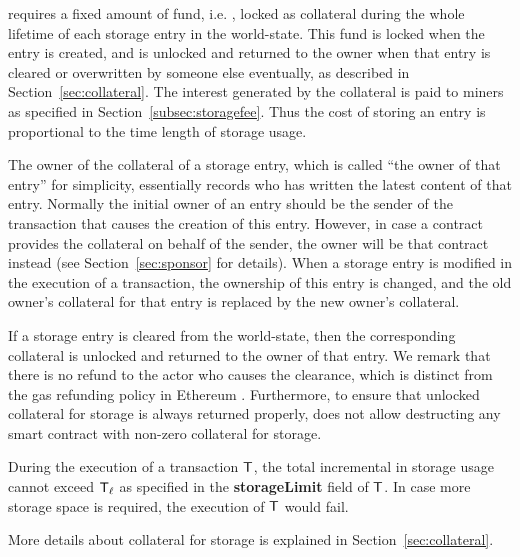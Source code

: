 	\name requires a fixed amount of fund, i.e. \sunitprice, locked as collateral during the whole lifetime of each \sunitsize storage entry in the world-state.
	This fund is locked when the entry is created, and is unlocked and returned to the owner when that entry is cleared or overwritten by someone else eventually, as described in Section~\ref{sec:collateral}.
	The interest generated by the collateral is paid to miners as specified in Section~\ref{subsec:storagefee}. 
	Thus the cost of storing an entry  
	is proportional to the time length of storage usage.

	
	The owner of the collateral of a storage entry, 
	which is called ``the owner of that entry'' for simplicity, 
	essentially records who has written the latest content of that entry.
	Normally the initial owner of an entry should be the sender of the transaction that causes the creation of this entry. 
	However, in case a contract provides the collateral on behalf of the sender, the owner will be that contract instead (see Section~\ref{sec:sponsor} for details).
	When a storage entry is modified in the execution of a transaction,
	the ownership of this entry is changed,
	and the old owner's collateral for that entry is replaced by the new owner's collateral.


	If a storage entry is cleared from the world-state,
	then the corresponding collateral is unlocked and returned to the owner of that entry.
	We remark that there is no refund to the actor who causes the clearance, 
	which is distinct from the gas refunding policy in Ethereum \cite{ETH_yellow}.
	Furthermore, to ensure that unlocked collateral for storage is always returned properly, 
	\name does not allow destructing any smart contract with non-zero collateral for storage.


	During the execution of a transaction $\textsf{T}$, the total incremental in storage usage cannot exceed $\textsf{T}_\ell$ as specified in the \textbf{storageLimit} field of $\textsf{T}$.
	In case more storage space is required, the execution of $\textsf{T}$ would fail.

	More details about collateral for storage is explained in Section~\ref{sec:collateral}.


